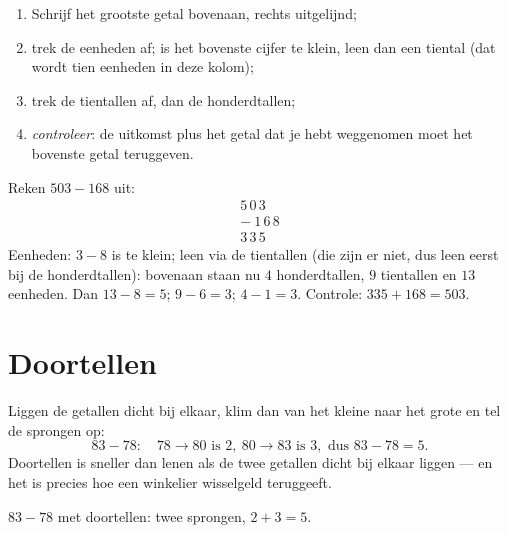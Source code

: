 \begin{method}\label{met:g2:subtraction:column}
\begin{enumerate}
  \item Schrijf het grootste getal bovenaan, rechts uitgelijnd;
  \item trek de eenheden af; is het bovenste cijfer te klein, leen dan
        een tiental (dat wordt tien eenheden in deze kolom);
  \item trek de tientallen af, dan de honderdtallen;
  \item \emph{controleer}: de uitkomst plus het getal dat je hebt
        weggenomen moet het bovenste getal teruggeven.
\end{enumerate}
\end{method}

\begin{example}\label{ex:g2:subtraction:worked}
Reken $503 - 168$ uit:
\[
\begin{array}{r}
5\,0\,3 \\
-\ 1\,6\,8 \\
\hline
3\,3\,5
\end{array}
\]
Eenheden: $3 - 8$ is te klein; leen via de tientallen (die zijn er
niet, dus leen eerst bij de honderdtallen): bovenaan staan nu $4$
honderdtallen, $9$ tientallen en $13$ eenheden. Dan $13 - 8 = 5$;
$9 - 6 = 3$; $4 - 1 = 3$. Controle: $335 + 168 = 503$. \checkmark
\end{example}

\section{Doortellen}

\begin{method}\label{met:g2:subtraction:countup}
Liggen de getallen dicht bij elkaar, klim dan van het kleine naar het
grote en tel de sprongen op:
\[
83 - 78: \quad 78 \to 80 \text{ is } 2, \ 80 \to 83 \text{ is } 3,
\text{ dus } 83 - 78 = 5 .
\]
Doortellen is sneller dan lenen als de twee getallen dicht bij elkaar
liggen --- en het is precies hoe een winkelier wisselgeld teruggeeft.
\end{method}

\begin{omfigure}

{\small $83 - 78$ met doortellen: twee sprongen, $2 + 3 = 5$.}
\end{omfigure}

